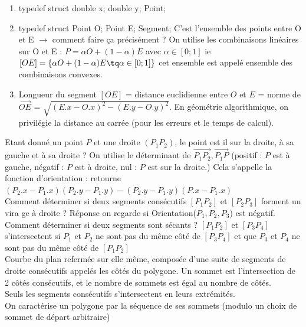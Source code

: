\begin{enumerate}
\item typedef struct { double x; double y; } Point; 
\item typedef struct { Point O; Point E; } Segment; C'est l'ensemble des points entre O et E $\rightarrow$ comment faire ça précisément ? On utilise les combinaisons linéaires sur O et E : $P = \alpha O + (1 - \alpha) E$ avec $\alpha \in [0;1]$ ie $[OE]=\{ \alpha O + (1 - \alpha) E \tq \alpha \in [0;1] \}$ cet ensemble est appelé ensemble des combinaisons convexes.
\item Longueur du segment $[OE]$ = distance euclidienne entre $O$ et $E$ = norme de $\vec{OE}$ = $\sqrt{(E.x - O.x)^2 - (E.y - O.y)^2}$. En géométrie algorithmique, on privilégie la distance au carrée (pour les erreurs et le temps de calcul).
\end{enumerate}

 Etant donné un point $P$ et une droite $(P_1P_2)$, le point est il sur la droite, à sa gauche et à sa droite ? On utilise le déterminant de $\vec{P_1P_2},\vec{P_1P}$ (positif : $P$ est à gauche, négatif : $P$ est à droite, nul : $P$ est sur la droite.) Cela s'appelle la fonction d'orientation : retourne $(P_2.x - P_1.x)(P_2.y - P_1.y) - (P_2.y - P_1.y)(P.x - P_1.x)$\\

 Comment déterminer si deux segments consécutifs $[P_1P_2]$ et $[P_2P_3]$ forment un vira	ge à droite ? Réponse on regarde si Orientation($P_1,P_2,P_3$) est négatif. \\

 Comment déterminer si deux segments sont sécants ? $[P_1P_2]$ et $[P_3P_4]$ s'intersectent si $P_1$ et $P_2$ ne sont pas du même côté de $[P_3P_4]$ et que $P_3$ et $P_4$ ne sont pas du même côté de $[P_1P_2]$\\

 Courbe du plan refermée sur elle même, composée d'une suite de segments de droite consécutifs appelés les côtés du polygone. Un sommet est l'intersection de 2 côtés consécutifs, et le nombre de sommets est égal au nombre de côtés.\\

 Seuls les segments consécutifs s'intersectent en leurs extrémités.\\

 On caractérise un polygone par la séquence de ses sommets (modulo un choix de sommet de départ arbitraire)\\

